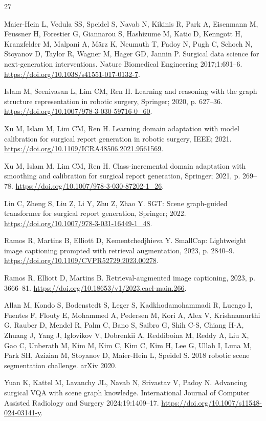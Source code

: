 \documentclass[11pt]{article}
\begin{document}
\begin{thebibliography}{27}

 Maier-Hein L, Vedula SS, Speidel S, Navab N, Kikinis R, Park A, Eisenmann M, Feussner H, Forestier G, Giannarou S, Hashizume M, Katic D, Kenngott H, Kranzfelder M, Malpani A, M\"arz K, Neumuth T, Padoy N, Pugh C, Schoch N, Stoyanov D, Taylor R, Wagner M, Hager GD, Jannin P. Surgical data science for next-generation interventions. Nature Biomedical Engineering 2017;1:691--6. \url{https://doi.org/10.1038/s41551-017-0132-7}.

 Islam M, Seenivasan L, Lim CM, Ren H. Learning and reasoning with the graph structure representation in robotic surgery, Springer; 2020, p. 627--36. \url{https://doi.org/10.1007/978-3-030-59716-0_60}.

 Xu M, Islam M, Lim CM, Ren H. Learning domain adaptation with model calibration for surgical report generation in robotic surgery, IEEE; 2021. \url{https://doi.org/10.1109/ICRA48506.2021.9561569}.

 Xu M, Islam M, Lim CM, Ren H. Class-incremental domain adaptation with smoothing and calibration for surgical report generation, Springer; 2021, p. 269--78. \url{https://doi.org/10.1007/978-3-030-87202-1_26}.

 Lin C, Zheng S, Liu Z, Li Y, Zhu Z, Zhao Y. SGT: Scene graph-guided transformer for surgical report generation, Springer; 2022. \url{https://doi.org/10.1007/978-3-031-16449-1_48}.

 Ramos R, Martins B, Elliott D, Kementchedjhieva Y. SmallCap: Lightweight image captioning prompted with retrieval augmentation, 2023, p. 2840--9. \url{https://doi.org/10.1109/CVPR52729.2023.00278}.

 Ramos R, Elliott D, Martins B. Retrieval-augmented image captioning, 2023, p. 3666--81. \url{https://doi.org/10.18653/v1/2023.eacl-main.266}.

 Allan M, Kondo S, Bodenstedt S, Leger S, Kadkhodamohammadi R, Luengo I, Fuentes F, Flouty E, Mohammed A, Pedersen M, Kori A, Alex V, Krishnamurthi G, Rauber D, Mendel R, Palm C, Bano S, Saibro G, Shih C-S, Chiang H-A, Zhuang J, Yang J, Iglovikov V, Dobrenkii A, Reddiboina M, Reddy A, Liu X, Gao C, Unberath M, Kim M, Kim C, Kim C, Kim H, Lee G, Ullah I, Luna M, Park SH, Azizian M, Stoyanov D, Maier-Hein L, Speidel S. 2018 robotic scene segmentation challenge. arXiv 2020.

 Yuan K, Kattel M, Lavanchy JL, Navab N, Srivastav V, Padoy N. Advancing surgical VQA with scene graph knowledge. International Journal of Computer Assisted Radiology and Surgery 2024;19:1409--17. \url{https://doi.org/10.1007/s11548-024-03141-y}.


\end{thebibliography}
\end{document}
